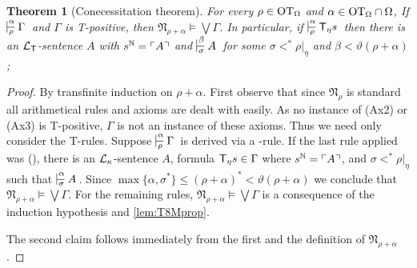 \documentclass[UKenglish,cleveref,DIV=12]{scrartcl}
\newtheorem{theorem}{Theorem}
\theoremstyle{definition}
\theoremstyle{definition}
\begin{document}
\begin{theorem}[Conecessitation theorem]\label{lem:T8model}\label{lem:T8TElim}
For every $\rho\in\mathrm{OT}_\Omega$ and $\alpha\in\mathrm{OT}_\Omega\cap\Omega$,
If\/ $\prov\alpha\rho\Gamma$ and $\Gamma$ is T-positive, then 
\( \mathfrak N_{\rho+\alpha}\models\bigvee\Gamma \).
In particular, if\/ $\prov\alpha\rho{\T_\eta s}$ then there is an $\mathcal{L}_{\mathsf{T}}$-sentence $A$ with $s^\mathbb N=\ulcorner{A}\urcorner$ and $\prov \beta \sigma A$ for some $\sigma <^* \rho|_\eta$ and $\beta < \vartheta(\rho+\alpha)$;
\end{theorem}
\begin{proof} 
By transfinite induction on $\rho + \alpha $.
First observe that since $\mathfrak N_\rho$ is standard all
arithmetical rules and axioms are dealt with easily. 
As no instance of (Ax2) or (Ax3) is T-positive, $\Gamma$ is not an instance of these axioms. 
Thus we need only consider the T-rules. Suppose $\prov\alpha\rho\Gamma$
is derived via a \textT\eta-rule. If the last rule applied was
(\Nec\eta), there is an $\mathcal{L}_\kappa$-sentence $A$, formula $\mathsf{T}_\eta s \in \Gamma$ where $s^\mathbb N=\ulcorner{A}\urcorner$, and $\sigma <^* \rho|_\eta $ such that $\prov{\alpha}\sigma A$.
Since $\max\{\alpha,\sigma^*\} \le (\rho + \alpha)^* < \vartheta(\rho + \alpha)	$ we conclude that $\mathfrak{N}_{\rho+\alpha}\models\bigvee\Gamma$.
%
For the remaining rules, $\mathfrak N_{\rho+\alpha}\models\bigvee\Gamma$ is a consequence of the induction hypothesis and \cref{lem:T8Mprop}.

The second claim follows immediately from the first and the definition of $\mathfrak N_{\rho+\alpha}$.

\end{proof}
\end{document}
